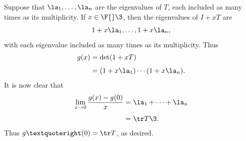 \begin{Solution}
Suppose that $\la_1, \ldots, \la_n$ are the eigenvalues of $T$, each included as many times as its multiplicity. If $x \in \F{}\3$, then the eigenvalues of $I + x T$ are
\[
1 + x \la_1, \ldots, 1 + x \la_n,
\]
with each eigenvalue included as many times as its multiplicity. Thus
\begin{align*}
g(x) &= \det(1 + x T) \\[4bp]
&= (1 + x \la_1) \cdots (1 + x \la_n).
\end{align*}
It is now clear that
\begin{align*}
\lim_{x \to 0} \frac{ g(x) - g(0)}{x} &= \la_1 + \dots + \la_n\\[4bp]
&= \tr T\3.
\end{align*}
Thus $g’(0) = \tr T$, as desired.
\end{Solution}

